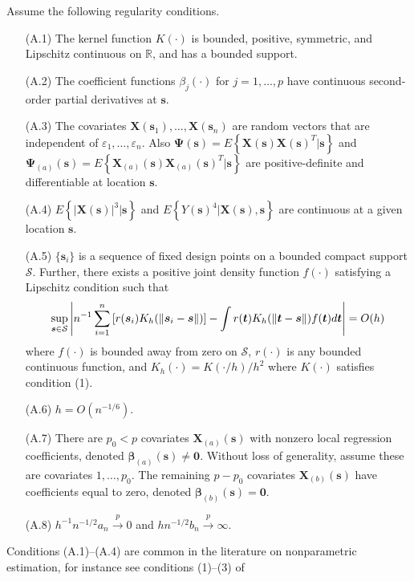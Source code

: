 \documentclass[authoryear,review, 12pt]{elsarticle}
\begin{document}
Assume the following regularity conditions.
\begin{itemize}
\item[(A.1)] The kernel function $K(\cdot)$ is bounded, positive, symmetric,
and Lipschitz continuous on $\mathbb{R}$, and has a bounded support.
\item[(A.2)] The coefficient functions $ $$\beta_{j}(\cdot)$ for $j=1,\dots,p$
have continuous second-order partial derivatives at $\bm{s}$.
\item[(A.3)] The covariates $\bm{X}(\bm{s}_{1}),\dots,\bm{X}(\bm{s}_{n})$ are
random vectors that are independent of $\varepsilon_{1},\dots,\varepsilon_{n}$.
Also $\bm{\Psi}(\bm{s})=E\left\{ \bm{X}(\bm{s})\bm{X}(\bm{s})^{T}|\bm{s}\right\} $
and $\bm{\Psi}_{(a)}(\bm{s})=E\left\{ \bm{X}_{(a)}(\bm{s})\bm{X}_{(a)}(\bm{s})^{T}|\bm{s}\right\} $
are positive-definite and differentiable at location $\bm{s}$.
\item[(A.4)] $E\left\{ \left|\bm{X}(\bm{s})\right|^{3}|\bm{s}\right\} $ and $E\left\{ Y(\bm{s})^{4}|\bm{X}(\bm{s}),\bm{s}\right\} $
are continuous at a given location $\bm{s}$.
\item[(A.5)] $\{\bm{s}_{i}\}$ is a sequence of fixed design points on a bounded
compact support $\mathcal{S}$. Further, there exists a positive joint
density function $f(\cdot)$ satisfying a Lipschitz condition such
that 
\[
\sup_{\bm{s}\text{\ensuremath{\in}}\mathcal{S}}\left|n^{-1}\sum_{i=1}^{n}\left[r(\bm{s}_{i})K_{h}(\|\bm{s}_{i}-\bm{s}\|)\right]-\int r(\bm{t})K_{h}(\|\bm{t}-\bm{s}\|)f(\bm{t})d\bm{t}\right|=O(h)
\]
where $f(\cdot)$ is bounded away from zero on $\mathcal{S}$, $r(\cdot)$
is any bounded continuous function, and $K_{h}(\cdot)=K(\cdot/h)/h^{2}$
where $K(\cdot)$ satisfies condition (1).
\item[(A.6)] $h=O\left(n^{-1/6}\right)$.
\item[(A.7)] There are $p_{0}<p$ covariates $\bm{X}_{(a)}(\bm{s})$ with nonzero
local regression coefficients, denoted $\bm{\beta}_{(a)}(\bm{s})\ne\bm{0}$.
Without loss of generality, assume these are covariates $1,\dots,p_{0}$.
The remaining $p-p_{0}$ covariates $\bm{X}_{(b)}(\bm{s})$ have coefficients
equal to zero, denoted $\bm{\beta}_{(b)}(\bm{s})=\bm{0}$.
\item[(A.8)] $h^{-1}n^{-1/2}a_{n}\xrightarrow{p}0$ and $hn^{-1/2}b_{n}\xrightarrow{p}\infty$.
\end{itemize}
Conditions (A.1)--(A.4) are common in the literature on nonparametric
estimation, for instance see conditions (1)--(3) of \citet{Sun-Yan-Zhang-Lu-2014}
\end{document}
